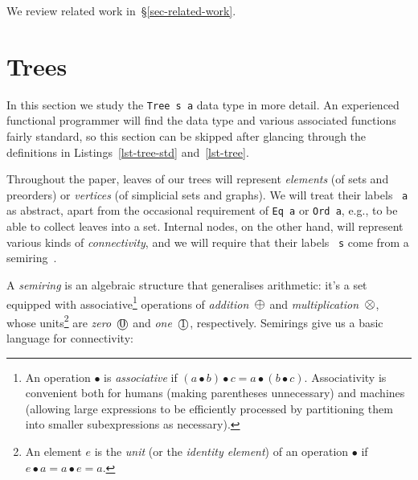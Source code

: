 \documentclass[english,submission]{programming}
\newcommand{\hcode}[1]{{\color{darkblue} \lstinline[keywordstyle={}]|#1|}} %
\newcommand{\add}{\text{\raisebox{-0.1mm}{\large $\oplus$}}}
\newcommand{\mul}{\text{\raisebox{-0.1mm}{\large $\otimes$}}}
\newcommand{\zero}{\raisebox{-0.2mm}{\textcircled{0}}\xspace}
\newcommand{\one}{\raisebox{-0.2mm}{\textcircled{1}}\xspace}
\begin{document}
\noindent
We review related work in~\S\ref{sec-related-work}.

\section{Trees}\label{sec-tree}

In this section we study the \hcode{Tree s a} data type in more detail. An
experienced functional programmer will find the data type and various
associated functions fairly standard, so this section can be skipped after
glancing through the definitions in Listings~\ref{lst-tree-std}
and~\ref{lst-tree}.

Throughout the paper, leaves of our trees will represent \emph{elements} (of
sets and preorders) or \emph{vertices} (of simplicial sets and graphs). We will
treat their labels~\hcode{a} as abstract, apart from the occasional requirement
of \hcode{Eq a} or \hcode{Ord a}, e.g., to be able to collect leaves into a set.
Internal nodes, on the other hand, will represent various kinds of
\emph{connectivity}, and we will require that their labels~\hcode{s} come from
a semiring~\cite{1999_semirings_golan}.

A \emph{semiring} is an algebraic structure that generalises arithmetic: it's a
set equipped with associative\footnote{
    An operation $\bullet$ is \emph{associative} if
    $(a \bullet b) \bullet c = a \bullet (b \bullet c)$. Associativity is
    convenient both for humans (making parentheses unnecessary) and machines
    (allowing large expressions to be efficiently processed by partitioning them
    into smaller subexpressions as necessary).
}
operations of \emph{addition}~$\add$ and \emph{multiplication}~$\mul$, whose
units\footnote{
    An element $e$ is the \emph{unit} (or the \emph{identity element}) of an
    operation $\bullet$ if $e \bullet a = a \bullet e = a$.
}
are \emph{zero}~$\text{\zero}$ and \emph{one}~$\text{\one}$, respectively.
Semirings give us a basic language for connectivity:
\end{document}

